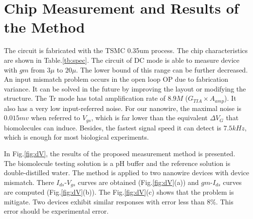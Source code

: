 \documentclass{article}
\begin{document}
\section{Chip Measurement and Results of the Method}
The circuit is fabricated with the TSMC 0.35um process.
The chip characteristics are shown in Table.\ref{tb:spec}.
The circuit of DC mode is able to measure device with $gm$ from $3\mu$ to $20\mu$.
The lower bound of this range can be further decreased.
An input mismatch problem occurs in the open loop OP due to fabrication variance.
It can be solved in the future by improving the layout or modifying the structure.
The Tr mode has total amplification rate of $8.9M$ ($G_{TIA} \times A_{amp}$).
It also has a very low input-referred noise.
For our nanowire, the maximal noise is $0.015mv$ when referred to $V_{gs}$, which is far lower than the equivalent $\Delta V_G$ that biomolecules can induce.
Besides, the fastest signal speed it can detect is $7.5kHz$, which is enough for most biological experiments.

In Fig.\ref{fig:dV}, the results of the proposed measurement method is presented.
The biomolecule testing solution is a pH buffer and the reference solution is double-distilled water.
The method is applied to two nanowire devices with device mismatch.
There $I_{ds}$-$V_{gs}$ curves are obtained (Fig.\ref{fig:dV}(a)) and $gm$-$I_{ds}$ curves are computed (Fig.\ref{fig:dV}(b)).
The Fig.\ref{fig:dV}(c) shows that the problem is mitigate.
Two devices exhibit similar responses with error less than 8\%.
This error should be experimental error.
\end{document}
